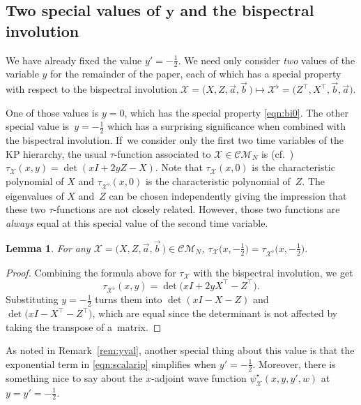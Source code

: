 \documentclass[10pt,a4paper]{amsart}
\numberwithin{equation}{section}
\newtheorem{Lemma}[Theorem]{Lemma}
\theoremstyle{definition}
\def\psistar{\psi^{\star}}
\def\X{\mathcal{X}}
\def\CM{\mathcal{C\!M}}
\begin{document}
\subsection[Two special values of y and the bispectral involution]{Two special values of $\boldsymbol{y}$ and the bispectral involution}

We have already fixed the value $y'=-\frac{1}{2}$. We need
only consider \textit{two} values of the variable $y$ for the
remainder of the paper, each of which has a special property with
respect to the bispectral involution $\X=\bigl(X,Z,\vec a,\vec b\,\bigr)\mapsto
\X^{\flat}=\bigl(Z^{\top},X^{\top},\vec b,\vec a\bigr)$.

One of those values is $y=0$, which has the special property
\eqref{eqn:bi0}.
The other special value is~${y=-\tfrac{1}{2}}$ which has a surprising
significance when combined with the bispectral involution.
If~we consider only the first two time variables of the KP hierarchy,
the usual $\tau$-function associated to $\X\in\CM_N$ is (cf.~\cite{WilsonCM})
$
\tau_{\X}(x,y)=\det(xI+2yZ-X)$.
Note that $\tau_{\X}(x,0)$ is the characteristic polynomial of
 $X$ and $\tau_{\X^{\flat}}(x,0)$ is the characteristic polynomial of~$Z$. The eigenvalues of $X$ and~$Z$ can be chosen independently
giving the impression that these two $\tau$-functions are not closely related.
However, those two functions are \textit{always} equal at this
 special value of the second time variable.

\begin{Lemma}\label{lem:weirdfact}
For any $\X=\bigl(X,Z,\vec a,\vec b\,\bigr)\in\CM_N$,
 $
 \tau_{\X}\bigl(x,-\frac{1}{2}\bigr)=\tau_{\X^\flat}\bigl(x,-\frac{1}{2}\bigr).
 $\end{Lemma}
 \begin{proof}
Combining the formula above for $\tau_{\X}$ with the bispectral
involution, we get
\[\tau_{\X^\flat}(x,y)=\det\bigl(x I+2y{X}^\top-{Z}^\top\bigr).\]
Substituting $y=-\tfrac{1}{2}$ turns them into
$\det(xI-X-Z)$ and $\det\bigl(xI-X^{\top}-Z^{\top}\bigr)$, which are equal since
the determinant is not affected by taking the transpose of a~matrix.
\end{proof}

As noted in Remark~\ref{rem:yval}, another special
thing about this value is that the exponential term in
\eqref{eqn:scalarip} simplifies when $y'=-\tfrac{1}{2}$. Moreover, there is something nice
to say about the $x$-adjoint wave function
$\psistar_{\X}(x,y,y',w)$ at $y=y'=-\tfrac{1}{2}$.
\end{document}
